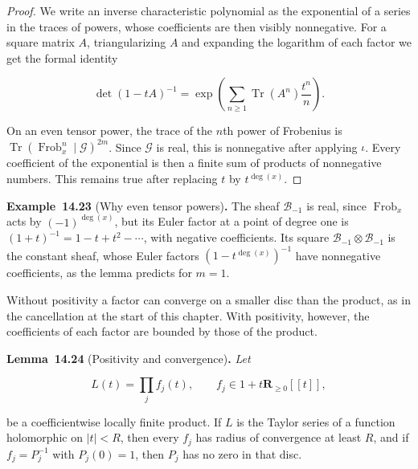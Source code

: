 \documentclass[11pt]{article}
\newenvironment{bpstatement}[2]{\par\addvspace{0.6\baselineskip}\noindent\textbf{#1}#2\textbf{.}\enspace\ignorespaces}
  {\par\addvspace{0.4\baselineskip}}
\newenvironment{bpstatementit}[2]{\begin{bpstatement}{#1}{#2}\itshape\ignorespaces}{\end{bpstatement}}
\begin{document}
\begin{proof}[{Proof}]\label{bp72}%
We write an inverse characteristic polynomial as the exponential of a series in the traces of powers, whose coefficients are then visibly nonnegative. For a square matrix \(A\), triangularizing \(A\) and expanding the logarithm of each factor we get the formal identity

\[
\det(1-tA)^{-1}
=\exp\left(\sum_{n\ge1}\operatorname{Tr}(A^n)\frac{t^n}{n}\right).
\]

On an even tensor power, the trace of the \(n\)th power of Frobenius is \(\operatorname{Tr}(\operatorname{Frob}_x^n\mid\mathcal G)^{2m}\). Since \(\mathcal G\) is real, this is nonnegative after applying \(\iota\).  Every coefficient of the exponential is then a finite sum of products of nonnegative numbers. This remains true after replacing \(t\) by \(t^{\deg(x)}\).
\end{proof}

\label{bp73}%
\begin{bpstatement}{Example~14.23}{ (Why even tensor powers)}
The sheaf \(\mathcal B_{-1}\) is real, since \(\operatorname{Frob}_x\) acts by \((-1)^{\deg(x)}\), but its Euler factor at a point of degree one is \((1+t)^{-1}=1-t+t^2-\cdots\), with negative coefficients. Its square \(\mathcal B_{-1}\otimes\mathcal B_{-1}\) is the constant sheaf, whose Euler factors \((1-t^{\deg(x)})^{-1}\) have nonnegative coefficients, as the lemma predicts for \(m=1\).
\end{bpstatement}

\label{bp74}%
Without positivity a factor can converge on a smaller disc than the product, as in the cancellation at the start of this chapter. With positivity, however, the coefficients of each factor are bounded by those of the product.

\label{bp75}%
\begin{bpstatementit}{Lemma~14.24}{ (Positivity and convergence)}
Let

\[
L(t)=\prod_j f_j(t),\qquad f_j\in1+t\mathbf R_{\ge0}[[t]],
\]

be a coefficientwise locally finite product. If \(L\) is the Taylor series of a function holomorphic on \(|t|<R\), then every \(f_j\) has radius of convergence at least \(R\), and if \(f_j=P_j^{-1}\) with \(P_j(0)=1\), then \(P_j\) has no zero in that disc.
\end{bpstatementit}
\end{document}
